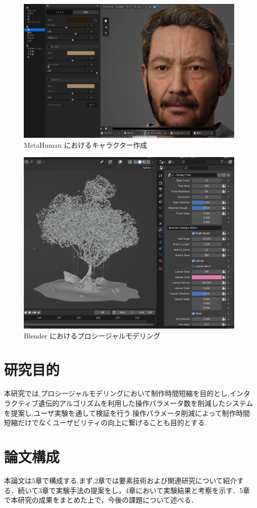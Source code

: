 \begin{figure}[h]
	\begin{center}
		\includegraphics[scale=0.4]{./imgs/metahuman1.PNG}
		\caption[MetaHuman におけるキャラクター作成]{MetaHuman \hyperref[fn:3]{\footnotemark[3]}におけるキャラクター作成\label{fig:metahuman_cc1}}
	\end{center}
\end{figure}


\begin{figure}
	\begin{center}
		\includegraphics[scale=0.5]{./imgs/blenderSFT.PNG}
		\caption{Blender におけるプロシージャルモデリング\label{fig:blenderSFT}}
	\end{center}
\end{figure}

\newpage
\section{研究目的}
    本研究では,プロシージャルモデリングにおいて制作時間短縮を目的とし,インタラクティブ遺伝的アルゴリズムを利用した操作パラメータ数を削減したシステムを提案し,ユーザ実験を通して検証を行う.操作パラメータ削減によって制作時間短縮だけでなくユーザビリティの向上に繋げることも目的とする.



\section{論文構成}
    本論文は5章で構成する.まず,2章では要素技術および関連研究について紹介する．続いて3章で実験手法の提案をし，4章において実験結果と考察を示す．5章で本研究の成果をまとめた上で，今後の課題について述べる．
